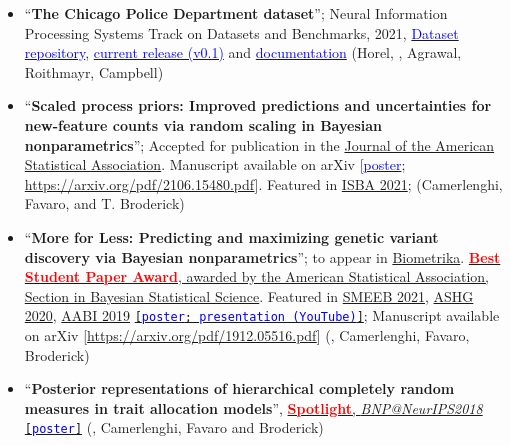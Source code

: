 \documentclass[10pt, a4paper]{article}
\begin{document}
\begin{itemize}
	\item ``\textbf{The Chicago Police Department dataset}''; Neural Information Processing Systems Track on Datasets and Benchmarks, 2021, \href{https://github.com/chicago-police-violence/data}{\textcolor{blue}{Dataset repository}}, \href{https://github.com/chicago-police-violence/data/releases/tag/v0.1}{\textcolor{blue}{current release (v0.1)}} and \href{https://github.com/chicago-police-violence/data/releases/download/v0.1/documentation.pdf}{\textcolor{blue}{documentation}} (Horel, \mm, Agrawal, Roithmayr, Campbell)
	\item ``\textbf{Scaled process priors: Improved predictions and uncertainties for new-feature counts via random scaling in Bayesian nonparametrics}''; Accepted for publication in the \href{https://www.tandfonline.com/doi/full/10.1080/01621459.2022.2115918}{Journal of the American Statistical Association}. Manuscript available on arXiv [\href{https://lorenzomasoero.com/files/spp_poster.pdf}{\textcolor{blue}{poster}}; \url{https://arxiv.org/pdf/2106.15480.pdf}]. Featured in \href{https://whova.com/portal/webapp/isbaw_202106/}{ISBA 2021}; (Camerlenghi, Favaro, \mm and T. Broderick)
	\item ``\textbf{More for Less: Predicting and maximizing genetic variant discovery via Bayesian nonparametrics}''; to appear in \href{https://academic.oup.com/biomet/advance-article-abstract/doi/10.1093/biomet/asab012/6146908?redirectedFrom=PDF}{Biometrika}.  \href{https://community.amstat.org/sbss/home}{\textbf{\textcolor{red}{Best Student Paper Award}}, awarded by the American Statistical Association, Section in Bayesian Statistical Science}. Featured in \href{https://liphlab.github.io/SMEEB2021/files/SMEEB2021_abstract_booklet.pdf}{SMEEB 2021}, \href{https://www.ashg.org/meetings/2020meeting}{ASHG 2020},  \href{https://openreview.net/pdf?id=B1l8tyhEYr}{AABI 2019} \href{https://lorenzomasoero.com/files/more_poster.pdf}{\texttt{[\textcolor{blue}{poster}; \href{https://www.youtube.com/watch?v=OQzyWf-OXK4&ab_channel=TamaraBroderick}{\textcolor{blue}{presentation (YouTube)}}]}}; Manuscript available on arXiv [\url{https://arxiv.org/pdf/1912.05516.pdf}] (\mm, Camerlenghi, Favaro, Broderick)
	\item``\textbf{Posterior representations of hierarchical completely random measures in trait allocation models}'', \href{https://sites.google.com/view/nipsbnp2018/accepted-papers}{\textcolor{red}{\textbf{Spotlight}}, \emph{BNP@NeurIPS2018}} \href{https://lorenzomasoero.com/files/bnp_neurips_2018_poster.pdf}{\texttt{[\textcolor{blue}{poster}]}}  (\mm, Camerlenghi, Favaro and Broderick)

\end{itemize}
\end{document}
